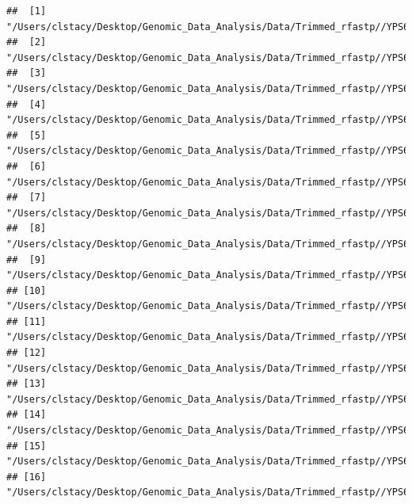 \documentclass[
]{book}
\newenvironment{Shaded}{\begin{snugshade}}{\end{snugshade}}
\newcommand{\AttributeTok}[1]{\textcolor[rgb]{0.13,0.29,0.53}{#1}}
\newcommand{\CommentTok}[1]{\textcolor[rgb]{0.56,0.35,0.01}{\textit{#1}}}
\newcommand{\ConstantTok}[1]{\textcolor[rgb]{0.56,0.35,0.01}{#1}}
\newcommand{\FunctionTok}[1]{\textcolor[rgb]{0.13,0.29,0.53}{\textbf{#1}}}
\newcommand{\NormalTok}[1]{#1}
\newcommand{\OtherTok}[1]{\textcolor[rgb]{0.56,0.35,0.01}{#1}}
\newcommand{\StringTok}[1]{\textcolor[rgb]{0.31,0.60,0.02}{#1}}
\begin{document}
\begin{Shaded}
\end{Shaded}

\begin{verbatim}
##  [1] "/Users/clstacy/Desktop/Genomic_Data_Analysis/Data/Trimmed_rfastp//YPS606_MSN24_ETOH_REP1_R1.fastq.gz.subread.BAM"
##  [2] "/Users/clstacy/Desktop/Genomic_Data_Analysis/Data/Trimmed_rfastp//YPS606_MSN24_ETOH_REP2_R1.fastq.gz.subread.BAM"
##  [3] "/Users/clstacy/Desktop/Genomic_Data_Analysis/Data/Trimmed_rfastp//YPS606_MSN24_ETOH_REP3_R1.fastq.gz.subread.BAM"
##  [4] "/Users/clstacy/Desktop/Genomic_Data_Analysis/Data/Trimmed_rfastp//YPS606_MSN24_ETOH_REP4_R1.fastq.gz.subread.BAM"
##  [5] "/Users/clstacy/Desktop/Genomic_Data_Analysis/Data/Trimmed_rfastp//YPS606_MSN24_MOCK_REP1_R1.fastq.gz.subread.BAM"
##  [6] "/Users/clstacy/Desktop/Genomic_Data_Analysis/Data/Trimmed_rfastp//YPS606_MSN24_MOCK_REP2_R1.fastq.gz.subread.BAM"
##  [7] "/Users/clstacy/Desktop/Genomic_Data_Analysis/Data/Trimmed_rfastp//YPS606_MSN24_MOCK_REP3_R1.fastq.gz.subread.BAM"
##  [8] "/Users/clstacy/Desktop/Genomic_Data_Analysis/Data/Trimmed_rfastp//YPS606_MSN24_MOCK_REP4_R1.fastq.gz.subread.BAM"
##  [9] "/Users/clstacy/Desktop/Genomic_Data_Analysis/Data/Trimmed_rfastp//YPS606_WT_ETOH_REP1_R1.fastq.gz.subread.BAM"   
## [10] "/Users/clstacy/Desktop/Genomic_Data_Analysis/Data/Trimmed_rfastp//YPS606_WT_ETOH_REP2_R1.fastq.gz.subread.BAM"   
## [11] "/Users/clstacy/Desktop/Genomic_Data_Analysis/Data/Trimmed_rfastp//YPS606_WT_ETOH_REP3_R1.fastq.gz.subread.BAM"   
## [12] "/Users/clstacy/Desktop/Genomic_Data_Analysis/Data/Trimmed_rfastp//YPS606_WT_ETOH_REP4_R1.fastq.gz.subread.BAM"   
## [13] "/Users/clstacy/Desktop/Genomic_Data_Analysis/Data/Trimmed_rfastp//YPS606_WT_MOCK_REP1_R1.fastq.gz.subread.BAM"   
## [14] "/Users/clstacy/Desktop/Genomic_Data_Analysis/Data/Trimmed_rfastp//YPS606_WT_MOCK_REP2_R1.fastq.gz.subread.BAM"   
## [15] "/Users/clstacy/Desktop/Genomic_Data_Analysis/Data/Trimmed_rfastp//YPS606_WT_MOCK_REP3_R1.fastq.gz.subread.BAM"   
## [16] "/Users/clstacy/Desktop/Genomic_Data_Analysis/Data/Trimmed_rfastp//YPS606_WT_MOCK_REP4_R1.fastq.gz.subread.BAM"
\end{verbatim}
\end{document}
